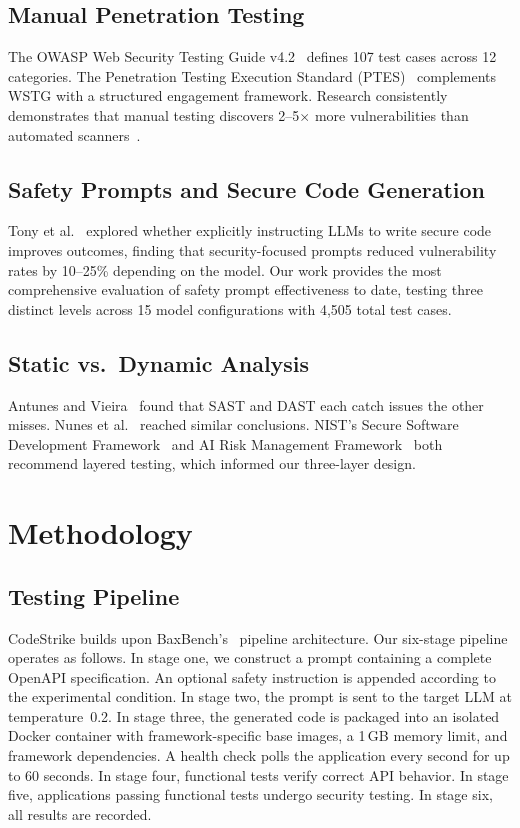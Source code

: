 \documentclass[conference,a4paper]{IEEEtran}
\begin{document}
\subsection{Manual Penetration Testing}
The OWASP Web Security Testing Guide v4.2~\cite{wstg} defines 107 test cases across 12 categories. The Penetration Testing Execution Standard (PTES)~\cite{ptes} complements WSTG with a structured engagement framework. Research consistently demonstrates that manual testing discovers 2--5$\times$ more vulnerabilities than automated scanners~\cite{doupe2010}.

\subsection{Safety Prompts and Secure Code Generation}
Tony et al.~\cite{tony2023} explored whether explicitly instructing LLMs to write secure code improves outcomes, finding that security-focused prompts reduced vulnerability rates by 10--25\% depending on the model. Our work provides the most comprehensive evaluation of safety prompt effectiveness to date, testing three distinct levels across 15 model configurations with 4,505 total test cases.

\subsection{Static vs.\ Dynamic Analysis}
Antunes and Vieira~\cite{antunes2009} found that SAST and DAST each catch issues the other misses. Nunes et al.~\cite{nunes2018} reached similar conclusions. NIST's Secure Software Development Framework~\cite{ssdf} and AI Risk Management Framework~\cite{airmf} both recommend layered testing, which informed our three-layer design.

\section{Methodology}

\subsection{Testing Pipeline}
CodeStrike builds upon BaxBench's~\cite{vero2025} pipeline architecture. Our six-stage pipeline operates as follows. In stage one, we construct a prompt containing a complete OpenAPI specification. An optional safety instruction is appended according to the experimental condition. In stage two, the prompt is sent to the target LLM at temperature~0.2. In stage three, the generated code is packaged into an isolated Docker container with framework-specific base images, a 1\,GB memory limit, and framework dependencies. A health check polls the application every second for up to 60 seconds. In stage four, functional tests verify correct API behavior. In stage five, applications passing functional tests undergo security testing. In stage six, all results are recorded.
\end{document}
